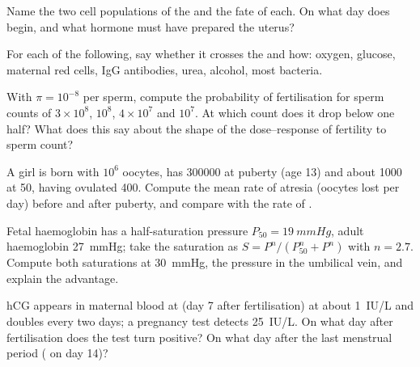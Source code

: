 \begin{exercise}[$\star$]\label{exo:b2:mammal-reproduction:3}
Name the two cell populations of the  and the fate of
each. On what day does  begin, and what hormone must
have prepared the uterus?
\end{exercise}

\begin{exercise}[$\star$]\label{exo:b2:mammal-reproduction:4}
For each of the following, say whether it crosses the  and
how: oxygen, glucose, maternal red cells, IgG antibodies, urea,
alcohol, most bacteria.
\end{exercise}

\begin{exercise}[$\star\star$]\label{exo:b2:mammal-reproduction:5}
With $\pi = 10^{-8}$ per sperm, compute the probability of
fertilisation for sperm counts of $3\times 10^{8}$, $10^{8}$,
$4\times 10^{7}$ and $10^{7}$. At which count does it drop below one
half? What does this say about the shape of the dose--response of
fertility to sperm count?
\end{exercise}

\begin{exercise}[$\star\star$]\label{exo:b2:mammal-reproduction:6}
A girl is born with $10^{6}$ oocytes, has \num{300000} at puberty
(age 13) and about \num{1000} at 50, having ovulated \num{400}.
Compute the mean rate of atresia (oocytes lost per day) before and
after puberty, and compare with the rate of .
\end{exercise}

\begin{exercise}[$\star\star$]\label{exo:b2:mammal-reproduction:7}
Fetal haemoglobin has a half-saturation pressure $P_{50} =
\qty{19}{mmHg}$, adult haemoglobin \qty{27}{mmHg}; take the
saturation as $S = P^{n}/(P_{50}^{n} + P^{n})$ with $n = 2.7$.
Compute both saturations at \qty{30}{mmHg}, the pressure in the
umbilical vein, and explain the advantage.
\end{exercise}

\begin{exercise}[$\star\star$]\label{exo:b2:mammal-reproduction:8}
hCG appears in maternal blood at  (day 7 after
fertilisation) at about \qty{1}{IU/L} and doubles every two days; a
pregnancy test detects \qty{25}{IU/L}. On what day after
fertilisation does the test turn positive? On what day after the
last menstrual period ( on day 14)?
\end{exercise}

